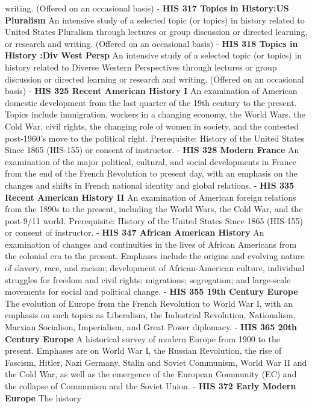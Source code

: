 \documentclass[
  letterpaper,
]{scrbook}
\begin{document}
writing. (Offered on an occasional basis) - \textbf{HIS 317 Topics in
History:US Pluralism} An intensive study of a selected topic (or topics)
in history related to United States Pluralism through lectures or group
discussion or directed learning, or research and writing. (Offered on an
occasional basis) - \textbf{HIS 318 Topics in History :Div West Persp}
An intensive study of a selected topic (or topics) in history related to
Diverse Western Perspectives through lectures or group discussion or
directed learning or research and writing. (Offered on an occasional
basis) - \textbf{HIS 325 Recent American History I} An examination of
American domestic development from the last quarter of the 19th century
to the present. Topics include immigration, workers in a changing
economy, the World Wars, the Cold War, civil rights, the changing role
of women in society, and the contested post-1960's move to the political
right. Prerequisite: History of the United States Since 1865 (HIS-155)
or consent of instructor. - \textbf{HIS 328 Modern France} An
examination of the major political, cultural, and social developments in
France from the end of the French Revolution to present day, with an
emphasis on the changes and shifts in French national identity and
global relations. - \textbf{HIS 335 Recent American History II} An
examination of American foreign relations from the 1890s to the present,
including the World Wars, the Cold War, and the post-9/11 world.
Prerequisite: History of the United States Since 1865 (HIS-155) or
consent of instructor. - \textbf{HIS 347 African American History} An
examination of changes and continuities in the lives of African
Americans from the colonial era to the present. Emphases include the
origins and evolving nature of slavery, race, and racism; development of
African-American culture, individual struggles for freedom and civil
rights; migrations; segregation; and large-scale movements for social
and political change. - \textbf{HIS 355 19th Century Europe} The
evolution of Europe from the French Revolution to World War I, with an
emphasis on such topics as Liberalism, the Industrial Revolution,
Nationalism, Marxian Socialism, Imperialism, and Great Power diplomacy.
- \textbf{HIS 365 20th Century Europe} A historical survey of modern
Europe from 1900 to the present. Emphases are on World War I, the
Russian Revolution, the rise of Fascism, Hitler, Nazi Germany, Stalin
and Soviet Communism, World War II and the Cold War, as well as the
emergence of the European Community (EC) and the collapse of Communism
and the Soviet Union. - \textbf{HIS 372 Early Modern Europe} The history
\end{document}
